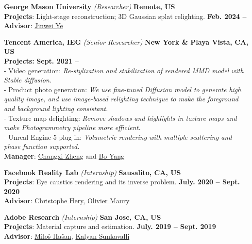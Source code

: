 \documentclass[margin,line]{resume}
\begin{document}
\begin{resume}
	\textbf{George Mason University} \textsl{(Researcher)} \hfill \textbf{Remote, US} \\
	\textbf{Projects}: Light-stage reconstruction; 3D Gaussian splat relighting. \hfill \textbf{Feb. 2024 -- } \hfill \\
	\textbf{Advisor}: \href{https://cs.gmu.edu/~jinweiye/}{Jinwei Ye}      
	
	\vspace{0.0mm}
	
	\textbf{Tencent America, IEG} \textsl{(Senior Researcher)} \hfill \textbf{New York \& Playa Vista, CA, US} \\
	\textbf{Projects:} \hfill \textbf{Sept. 2021 -- } \hfill \\
	- Video generation: \textsl{Re-stylization and stabilization of rendered MMD model with Stable diffusion.} \\
	- Product photo generation: \textsl{We use fine-tuned Diffusion model to generate high quality image, and use image-based relighting technique to make the foreground and background lighting consistant.} \\
	- Texture map delighting: \textsl{Remove shadows and highlights in texture maps and make Photogrammetry pipeline more efficient.} \\
	- Unreal Engine 5 plug-in: \textsl{Volumetric rendering with multiple scattering and phase function supported.} \\
	\textbf{Manager}: \href{https://www.cs.columbia.edu/~cxz/}{Changxi Zheng} and  \href{https://sites.google.com/site/boyanghome/home}{Bo Yang}
	
	\vspace{0.0mm}

	\textbf{Facebook Reality Lab} \textsl{(Internship)} \hfill \textbf{Sausalito, CA, US} \\
	\textbf{Projects}: Eye caustics rendering and its inverse problem. \hfill \textbf{July. 2020 -- Sept. 2020}\\
	\textbf{Advisor}: \href{https://graphics.pixar.com/library/indexAuthorChristophe_Hery.html}{Christophe Hery}, \href{https://www.imdb.com/name/nm1436524/}{Olivier Maury}       

    \vspace{0.0mm}

	\textbf{Adobe Research} \textsl{(Internship)} \hfill \textbf{San Jose, CA, US} \\
	\textbf{Projects}: Material capture and estimation. \hfill \textbf{July. 2019 -- Sept. 2019}\\
	\textbf{Advisor}: \href{http://miloshasan.net/}{Milo\v{s} Ha\v{s}an}, \href{https://research.adobe.com/person/kalyan-sunkavalli/}{Kalyan Sunkavalli}       


\end{resume}
\end{document}
